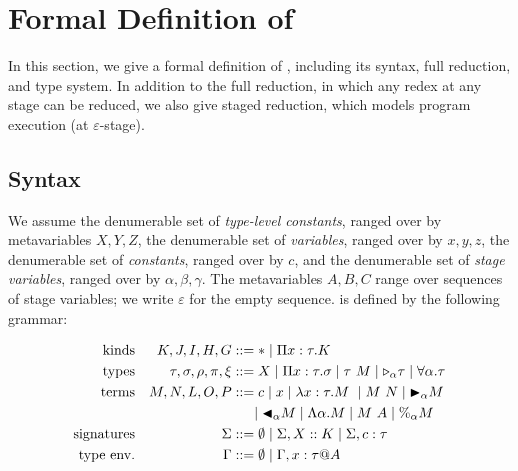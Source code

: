 
\section{Formal Definition of \LMD \label{sec:formal-definition}}
\label{sec:formal}

In this section, we give a formal definition of \LMD, including its syntax,
full reduction, and type system.  In addition to the full reduction, in which
any redex at any stage can be reduced, we also give staged reduction, which
models program execution (at \(\varepsilon\)-stage).

\subsection{Syntax}

We assume the denumerable set of \emph{type-level constants}, ranged over by
metavariables \(X, Y, Z\), the denumerable set of \emph{variables}, ranged
over by \(x,y,z\), the denumerable set of \emph{constants}, ranged over by
\(c\), and the denumerable set of \emph{stage variables}, ranged over by
\(\alpha, \beta, \gamma\).  The metavariables \(A, B, C\) range over
sequences of stage variables; we write \(\varepsilon\) for the empty
sequence. \LMD is defined by the following grammar:

{
\begin{align*}
   \textrm{kinds}             &  & K,J,I,H,G                & ::= * \mid \Pi x:\tau.K                                                           \\
    \textrm{types}             &  & \tau,\sigma,\rho,\pi,\xi & ::= X \mid \Pi x:\tau.\sigma \mid \tau\ M \mid {\mathop{\triangleright}}_{\alpha} \tau \mid \forall\alpha.\tau \\
    \textrm{terms}             &  & M,N,L,O,P                & ::= c \mid x \mid \lambda x:\tau.M\ \mid M\ N \mid {\mathop{\blacktriangleright}}_\alpha M                   \\
                               &  &                          & \ \ \ \ \mid {\mathop{\blacktriangleleft}}_\alpha M \mid \Lambda\alpha.M \mid M\ A \mid \%_\alpha M        \\
    \textrm{signatures}         &  & \Sigma                   & ::= \emptyset \mid \Sigma, X::K \mid \Sigma, c:\tau                               \\
    \textrm{type env.} &  & \Gamma                   & ::= \emptyset \mid  \Gamma,x:\tau @A                                              \\
\end{align*}
}

